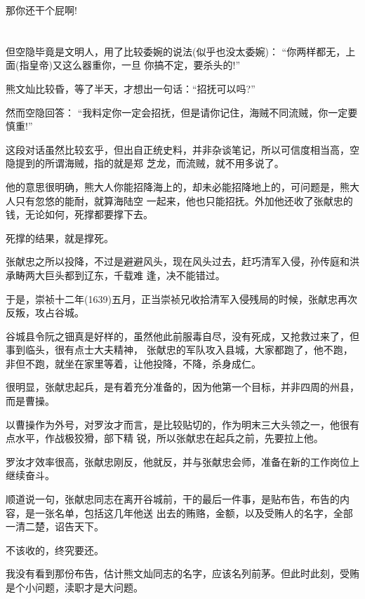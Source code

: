 \documentclass[11pt,a4paper,onecolumn]{article}
\begin{document}
那你还干个屁啊!

\section[\thesection]{}

但空隐毕竟是文明人，用了比较委婉的说法(似乎也没太委婉)： ``你两样都无，上面(指皇帝)又这么器重你，一旦
你搞不定，要杀头的!''

熊文灿比较昏，等了半天，才想出一句话：``招抚可以吗?''

然而空隐回答： ``我料定你一定会招抚，但是请你记住，海贼不同流贼，你一定要慎重!''

这段对话虽然比较玄乎，但出自正统史料，并非杂谈笔记，所以可信度相当高，空隐提到的所谓海贼，指的就是郑
芝龙，而流贼，就不用多说了。

他的意思很明确，熊大人你能招降海上的，却未必能招降地上的，可问题是，熊大人只有忽悠的能耐，就算海陆空
一起来，他也只能招抚。外加他还收了张献忠的钱，无论如何，死撑都要撑下去。

死撑的结果，就是撑死。

张献忠之所以投降，不过是避避风头，现在风头过去，赶巧清军入侵，孙传庭和洪承畴两大巨头都到辽东，千载难
逢，决不能错过。

于是，崇祯十二年(1639)五月，正当崇祯兄收拾清军入侵残局的时候，张献忠再次反叛，攻占谷城。

谷城县令阮之钿真是好样的，虽然他此前服毒自尽，没有死成，又抢救过来了，但事到临头，很有点士大夫精神，
张献忠的军队攻入县城，大家都跑了，他不跑，非但不跑，就坐在家里等着，让他投降，不降，杀身成仁。

很明显，张献忠起兵，是有着充分准备的，因为他第一个目标，并非四周的州县，而是曹操。

以曹操作为外号，对罗汝才而言，是比较贴切的，作为明末三大头领之一，他很有点水平，作战极狡猾，部下精
锐，所以张献忠在起兵之前，先要拉上他。

罗汝才效率很高，张献忠刚反，他就反，并与张献忠会师，准备在新的工作岗位上继续奋斗。

顺道说一句，张献忠同志在离开谷城前，干的最后一件事，是贴布告，布告的内容，是一张名单，包括这几年他送
出去的贿赂，金额，以及受贿人的名字，全部一清二楚，诏告天下。

不该收的，终究要还。

我没有看到那份布告，估计熊文灿同志的名字，应该名列前茅。但此时此刻，受贿是个小问题，渎职才是大问题。

\section[\thesection]{}
\end{document}
